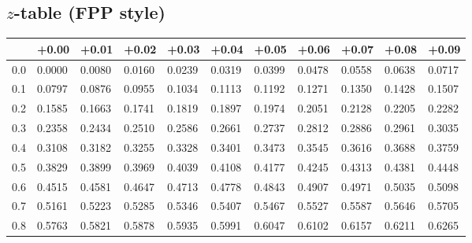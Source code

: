 \documentclass{article}
\begin{document}
\begin{center}
\section*{$z$-table (FPP style)}
%
\begin{tabular}{lllllllllll}
\toprule
 & +0.00 & +0.01 & +0.02 & +0.03 & +0.04 & +0.05 & +0.06 & +0.07 & +0.08 & +0.09 \\
\midrule
0.0 & \cellcolor{gray!20}0.0000 & \cellcolor{gray!20}0.0080 & \cellcolor{gray!20}0.0160 & \cellcolor{gray!20}0.0239 & \cellcolor{gray!20}0.0319 & \cellcolor{gray!20}0.0399 & \cellcolor{gray!20}0.0478 & \cellcolor{gray!20}0.0558 & \cellcolor{gray!20}0.0638 & \cellcolor{gray!20}0.0717 \\
0.1 & 0.0797 & 0.0876 & 0.0955 & 0.1034 & 0.1113 & 0.1192 & 0.1271 & 0.1350 & 0.1428 & 0.1507 \\
0.2 & \cellcolor{gray!20}0.1585 & \cellcolor{gray!20}0.1663 & \cellcolor{gray!20}0.1741 & \cellcolor{gray!20}0.1819 & \cellcolor{gray!20}0.1897 & \cellcolor{gray!20}0.1974 & \cellcolor{gray!20}0.2051 & \cellcolor{gray!20}0.2128 & \cellcolor{gray!20}0.2205 & \cellcolor{gray!20}0.2282 \\
0.3 & 0.2358 & 0.2434 & 0.2510 & 0.2586 & 0.2661 & 0.2737 & 0.2812 & 0.2886 & 0.2961 & 0.3035 \\
0.4 & \cellcolor{gray!20}0.3108 & \cellcolor{gray!20}0.3182 & \cellcolor{gray!20}0.3255 & \cellcolor{gray!20}0.3328 & \cellcolor{gray!20}0.3401 & \cellcolor{gray!20}0.3473 & \cellcolor{gray!20}0.3545 & \cellcolor{gray!20}0.3616 & \cellcolor{gray!20}0.3688 & \cellcolor{gray!20}0.3759 \\
0.5 & 0.3829 & 0.3899 & 0.3969 & 0.4039 & 0.4108 & 0.4177 & 0.4245 & 0.4313 & 0.4381 & 0.4448 \\
0.6 & \cellcolor{gray!20}0.4515 & \cellcolor{gray!20}0.4581 & \cellcolor{gray!20}0.4647 & \cellcolor{gray!20}0.4713 & \cellcolor{gray!20}0.4778 & \cellcolor{gray!20}0.4843 & \cellcolor{gray!20}0.4907 & \cellcolor{gray!20}0.4971 & \cellcolor{gray!20}0.5035 & \cellcolor{gray!20}0.5098 \\
0.7 & 0.5161 & 0.5223 & 0.5285 & 0.5346 & 0.5407 & 0.5467 & 0.5527 & 0.5587 & 0.5646 & 0.5705 \\
0.8 & \cellcolor{gray!20}0.5763 & \cellcolor{gray!20}0.5821 & \cellcolor{gray!20}0.5878 & \cellcolor{gray!20}0.5935 & \cellcolor{gray!20}0.5991 & \cellcolor{gray!20}0.6047 & \cellcolor{gray!20}0.6102 & \cellcolor{gray!20}0.6157 & \cellcolor{gray!20}0.6211 & \cellcolor{gray!20}0.6265 \\

\end{tabular}
\end{center}
\end{document}
